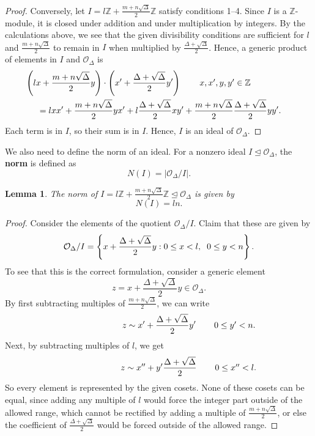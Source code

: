 \documentclass[honours,12pt]{unswthesis}
\newcommand{\Z}{\mathbb{Z}} %
\newcommand{\order}{\mathcal{O}} %
\newcommand{\rnote}[1]{\rlap{\hspace{0.75cm}$#1$}}
\newtheorem{lemma}[theorem]{Lemma}
\numberwithin{equation}{section}
\begin{document}
\begin{proof}
    Conversely, let $I = l\Z + \frac{m + n\sqrt\Delta}{2}\Z$ satisfy conditions 1--4.
    Since $I$ is a $\Z$-module, it is closed under addition and under multiplication by integers.
    By the calculations above, we see that the given divisibility conditions are sufficient for $l$ and $\frac{m + n\sqrt\Delta}{2}$ to remain in $I$ when multiplied by $\frac{\Delta + \sqrt\Delta}{2}$.
    Hence, a generic product of elements in $I$ and $\order_\Delta$ is
    \begin{align*}
        &\hspace{-5mm} \left( lx + \frac{m + n\sqrt\Delta}{2}y \right) \cdot \left( x' + \frac{\Delta + \sqrt\Delta}{2} y' \right) \rnote{x, x', y, y' \in \Z} \\
        &= lxx' + \frac{m + n\sqrt\Delta}{2} yx' + l \frac{\Delta + \sqrt\Delta}{2} xy' + \frac{m + n\sqrt\Delta}{2} \frac{\Delta + \sqrt\Delta}{2} yy'.
    \end{align*}
    Each term is in $I$, so their sum is in $I$. 
    Hence, $I$ is an ideal of $\order_\Delta$.
\end{proof}

We also need to define the norm of an ideal.
For a nonzero ideal $I \trianglelefteq \order_\Delta$, the \textbf{norm} is defined as
$$N(I) = \left| \order_\Delta / I \right|.$$

\vspace{2mm}
\begin{lemma}\label{lemma-ideal-norm}
    The norm of $I = l\Z + \frac{m + n\sqrt\Delta}{2} \Z \trianglelefteq \order_\Delta$ is given by
    $$ N(I) = ln .$$
\end{lemma}

\begin{proof}
    Consider the elements of the quotient $\order_\Delta / I$.
    Claim that these are given by
    $$\order_\Delta / I = \left\{ x + \frac{\Delta + \sqrt\Delta}{2}y \mathrel{:} 0 \leq x < l, \hspace{2mm} 0 \leq y < n \right\}.$$
    To see that this is the correct formulation, consider a generic element 
    $$z = x + \frac{\Delta + \sqrt\Delta}{2}y \in \order_\Delta.$$
    By first subtracting multiples of $\frac{m + n\sqrt\Delta}{2}$, we can write
    $$z \sim x' + \frac{\Delta + \sqrt\Delta}{2}y' \rnote{0 \leq y' < n.}$$
    Next, by subtracting multiples of $l$, we get
    $$z \sim x'' + y'\frac{\Delta + \sqrt\Delta}{2} \rnote{0 \leq x'' < l.}$$
    So every element is represented by the given cosets.
    None of these cosets can be equal, since adding any multiple of $l$ would force the integer part outside of the allowed range, which cannot be rectified by adding a multiple of $\frac{m + n\sqrt\Delta}{2}$, or else the coefficient of $\frac{\Delta + \sqrt\Delta}{2}$ would be forced outside of the allowed range.
\end{proof}
\end{document}
